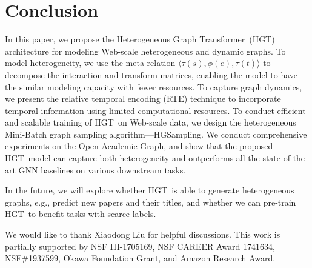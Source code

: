 \documentclass[sigconf]{acmart}
\theoremstyle{definition}
\newcommand{\model}{Heterogeneous Graph Transformer}
\newcommand{\short}{HGT}
\newcommand{\sampling}{HGSampling}
\begin{document}
\section{Conclusion}\label{sec:conclusion}



In this paper, we propose the \model\ (\short) architecture for modeling Web-scale heterogeneous and dynamic graphs. 
To model heterogeneity, we use the meta relation $\langle \tau(s), \phi(e), \tau(t) \rangle$ to decompose the interaction and transform matrices, enabling the model to have the similar modeling capacity with fewer resources.
To capture graph dynamics, we present the relative temporal encoding  (RTE) technique to incorporate temporal information using limited computational resources. 
To conduct efficient and scalable training of \short\ on Web-scale data, we design the heterogeneous Mini-Batch graph sampling algorithm---\sampling. 
We conduct comprehensive experiments on the Open Academic Graph, and show that the proposed \short\ model can capture both heterogeneity and outperforms all the state-of-the-art GNN baselines on various downstream tasks.

In the future, we will explore whether \short\ is able to generate heterogeneous graphs, e.g., predict new papers and their titles, and whether we can pre-train \short\ to benefit tasks with scarce labels.


 We would like to thank Xiaodong Liu for helpful discussions. This work is partially supported by NSF III-1705169, NSF CAREER Award 1741634, NSF\#1937599, Okawa Foundation Grant, and Amazon Research Award. 

  
\balance

\end{document}
